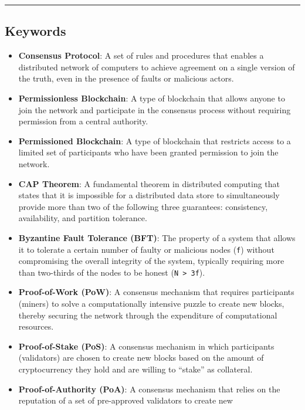\begin{center}\rule{0.5\linewidth}{0.5pt}\end{center}

\subsection{Keywords}\label{keywords}

\begin{itemize}
	\tightlist
	\item
	\textbf{Consensus Protocol}: A set of rules and procedures that
	enables a distributed network of computers to achieve agreement on a
	single version of the truth, even in the presence of faults or
	malicious actors.
	\item
	\textbf{Permissionless Blockchain}: A type of blockchain that allows
	anyone to join the network and participate in the consensus process
	without requiring permission from a central authority.
	\item
	\textbf{Permissioned Blockchain}: A type of blockchain that restricts
	access to a limited set of participants who have been granted
	permission to join the network.
	\item
	\textbf{CAP Theorem}: A fundamental theorem in distributed computing
	that states that it is impossible for a distributed data store to
	simultaneously provide more than two of the following three
	guarantees: consistency, availability, and partition tolerance.
	\item
	\textbf{Byzantine Fault Tolerance (BFT)}: The property of a system
	that allows it to tolerate a certain number of faulty or malicious
	nodes (\texttt{f}) without compromising the overall integrity of the
	system, typically requiring more than two-thirds of the nodes to be
	honest (\texttt{N\ \textgreater{}\ 3f}).
	\item
	\textbf{Proof-of-Work (PoW)}: A consensus mechanism that requires
	participants (miners) to solve a computationally intensive puzzle to
	create new blocks, thereby securing the network through the
	expenditure of computational resources.
	\item
	\textbf{Proof-of-Stake (PoS)}: A consensus mechanism in which
	participants (validators) are chosen to create new blocks based on the
	amount of cryptocurrency they hold and are willing to ``stake'' as
	collateral.
	\item
	\textbf{Proof-of-Authority (PoA)}: A consensus mechanism that relies
	on the reputation of a set of pre-approved validators to create new

\end{itemize}

